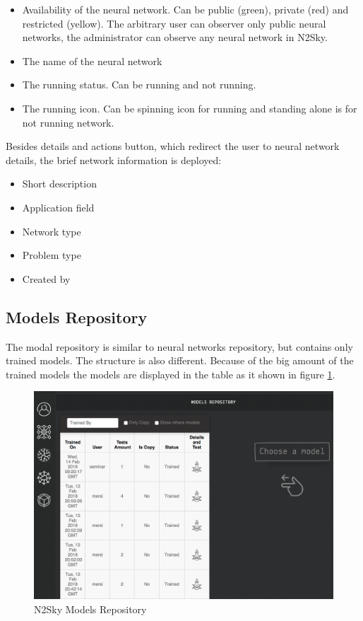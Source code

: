 \begin{enumerate}
\begin{itemize}
\item Availability of the neural network. Can be public (green), private (red) and restricted (yellow). The arbitrary user can observer only public neural networks, the administrator can observe any neural network in N2Sky.  

\item The name of the neural network
\item The running status. Can be running and not running.
\item The running icon. Can be spinning icon for running and standing alone is for not running network.
\end{itemize}

Besides details and actions button, which redirect the user to neural network details, the brief network information is deployed:
\begin{itemize}
\item Short description
\item Application field
\item Network type
\item Problem type
\item Created by
\end{itemize}

\end{enumerate}

\subsection{Models Repository}\label{Models Repository}

The modal repository is similar to neural networks repository, but contains only trained models. The structure is also different. Because of the big amount of the trained models the models are displayed in the table as it shown in figure \ref{fig:model_repo}. 

\begin{figure}[htbp]
\begin{center}
  \includegraphics[width=\linewidth]{components/5/img/model_repo.png}
  \caption{N2Sky Models Repository}
  \label{fig:model_repo}
\end{center}
\end{figure}

